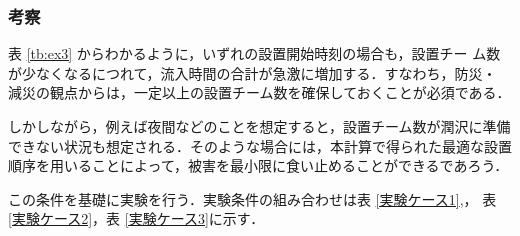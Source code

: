 \documentclass[a4paper,12pt,fleqn]{jarticle}
\begin{document}
\subsubsection{考察}

表 \ref{tb:ex3} からわかるように，いずれの設置開始時刻の場合も，設置チー
ム数が少なくなるにつれて，流入時間の合計が急激に増加する．すなわち，防災・
減災の観点からは，一定以上の設置チーム数を確保しておくことが必須である．

しかしながら，例えば夜間などのことを想定すると，設置チーム数が潤沢に準備
できない状況も想定される．そのような場合には，本計算で得られた最適な設置
順序を用いることによって，被害を最小限に食い止めることができるであろう．


この条件を基礎に実験を行う．実験条件の組み合わせは表 \ref{実験ケース1},，
表 \ref{実験ケース2}，表 \ref{実験ケース3}に示す．\\

\begin{table}[H]
  \begin{center}
    \caption{実験 1 の条件}
      \label{実験ケース1}
    \end{center}
\end{table}
\end{document}
